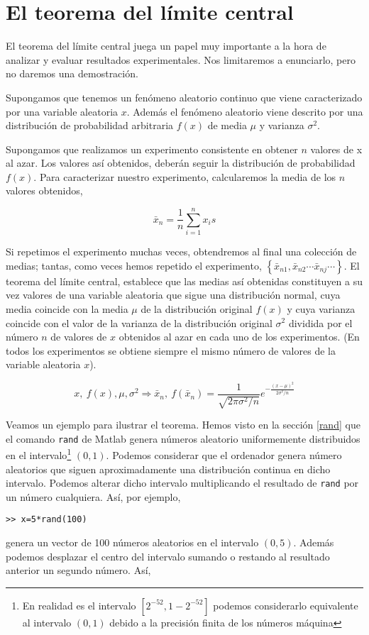 \section{El teorema del límite central}\label{tlc}

El teorema del límite central juega un papel muy importante a la hora de analizar y evaluar resultados experimentales. Nos limitaremos a enunciarlo, pero no daremos una demostración.

Supongamos que tenemos un fenómeno aleatorio continuo que viene caracterizado por una variable aleatoria $x$. Además el fenómeno aleatorio viene descrito por una distribución de probabilidad arbitraria $f(x)$ de media $\mu$ y varianza $\sigma^2$.

Supongamos que realizamos un experimento consistente en obtener $n$ valores de x al azar. Los valores así obtenidos, deberán seguir la distribución de probabilidad $f(x)$. Para caracterizar nuestro experimento, calcularemos la media de los $n$ valores obtenidos,

\begin{equation*}
\bar{x}_n=\frac{1}{n}\sum_{i=1}^n x_is
\end{equation*}

Si repetimos el experimento muchas veces, obtendremos al final una colección de medias; tantas, como veces hemos repetido el experimento,
$\left\{\bar{x}_{n1}, \bar{x}_{n2} \cdots \bar{x}_{nj} \cdots \right\}$. El teorema del límite central, establece que las medias así obtenidas constituyen a su vez valores de una variable aleatoria que sigue una distribución normal, cuya media coincide con la media $\mu$ de la distribución original $f(x)$ y cuya varianza coincide con el valor de la varianza de la distribución original $\sigma^2$ dividida por el número $n$ de valores de $x$ obtenidos al azar en cada uno de los experimentos. (En todos los experimentos se obtiene siempre el mismo número de valores de la variable aleatoria $x$).

\begin{equation*}
x, \ f(x), \mu, \sigma^2 \Rightarrow \bar{x}_n,\ f(\bar{x}_n)=\frac{1}{\sqrt{2\pi\sigma^2/n}}e^{-\frac{(x-\mu)^2}{2\sigma^2/n}}  
\end{equation*}

Veamos un ejemplo para ilustrar el teorema. Hemos visto en la sección \ref{rand} que el comando \texttt{rand} de Matlab genera números aleatorio uniformemente distribuidos en el intervalo\footnote{En realidad es el intervalo $[2^{-52},1-2^{-52}]$ podemos considerarlo equivalente al intervalo $(0,1)$ debido a la precisión finita de los números máquina} $(0,1)$. Podemos considerar que el ordenador genera número aleatorios que siguen aproximadamente una distribución continua en dicho intervalo. Podemos alterar dicho intervalo multiplicando el resultado de \texttt{rand} por un número cualquiera. Así, por ejemplo,
\begin{verbatim}
>> x=5*rand(100)
\end{verbatim} 
genera un vector de 100 números aleatorios en el intervalo $(0,5)$.
Además podemos desplazar el centro del intervalo sumando o restando al resultado anterior un segundo número. Así,

